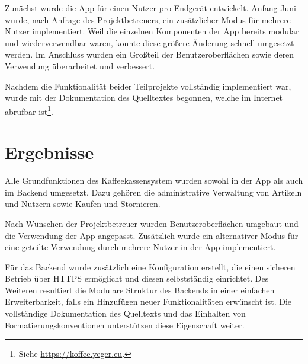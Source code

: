 Zunächst wurde die App für einen Nutzer pro Endgerät entwickelt.
Anfang Juni wurde, nach Anfrage des Projektbetreuers, ein zusätzlicher Modus für mehrere Nutzer implementiert.
Weil die einzelnen Komponenten der App bereits modular und wiederverwendbar waren, konnte diese größere Änderung schnell umgesetzt werden. 
Im Anschluss wurden ein Großteil der Benutzeroberflächen sowie deren Verwendung überarbeitet und verbessert.

Nachdem die Funktionalität beider Teilprojekte vollständig implementiert war, wurde mit der Dokumentation des Quelltextes begonnen, welche im Internet abrufbar ist\footnote{Siehe \url{https://koffee.yeger.eu}.}.

\section{Ergebnisse}
\label{sec:methodologies:results}
Alle Grundfunktionen des Kaffeekassensystem wurden sowohl in der App als auch im Backend umgesetzt.
Dazu gehören die administrative Verwaltung von Artikeln und Nutzern sowie Kaufen und Stornieren.

Nach Wünschen der Projektbetreuer wurden Benutzeroberflächen umgebaut und die Verwendung der App angepasst.
Zusätzlich wurde ein alternativer Modus für eine geteilte Verwendung durch mehrere Nutzer in der App implementiert.

Für das Backend wurde zusätzlich eine Konfiguration erstellt, die einen sicheren Betrieb über HTTPS ermöglicht und diesen selbstständig einrichtet.
Des Weiteren resultiert die Modulare Struktur des Backends in einer einfachen Erweiterbarkeit, falls ein Hinzufügen neuer Funktionalitäten erwünscht ist.
Die vollständige Dokumentation des Quelltexts und das Einhalten von Formatierungskonventionen unterstützen diese Eigenschaft weiter.

